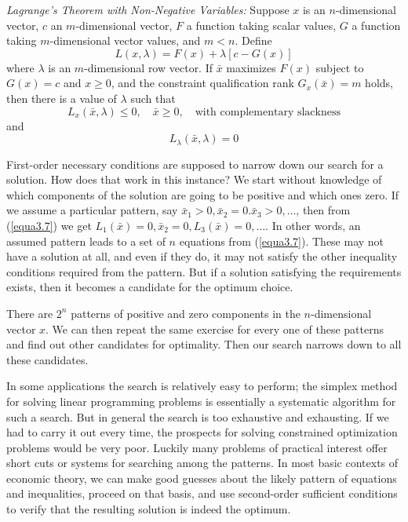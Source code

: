 \textit{Lagrange's Theorem with Non-Negative Variables:} Suppose $x$ is an $n$-dimensional vector, $c$ an $m$-dimensional vector, $F$ a function taking scalar values, $G$ a function taking $m$-dimensional vector values, and $m<n$. Define
\begin{equation*} \tag{3.4}
L(x, \lambda) = F(x) + \lambda[c-G(x)]
\end{equation*}
where $\lambda$ is an $m$-dimensional row vector. If $\bar{x}$ maximizes $F(x)$ subject to $G(x)=c$ and $x \geq 0$, and the constraint qualification rank $G_x(\bar{x}) = m $ holds, then there is a value of $\lambda$ such that
\begin{equation*} \tag{3.7}
L_x(\bar{x}, \lambda) \leq 0, \quad \bar{x} \geq 0, \quad \mbox{with complementary slackness}
\end{equation*}
and
\begin{equation*} \tag{3.6}
L_\lambda(\bar{x}, \lambda) = 0
\end{equation*}

First-order necessary conditions are supposed to narrow down our search for a solution. How does that work in this instance? We start without knowledge of which components of the solution are going to be positive and which ones zero. If we assume a particular pattern, say $\bar{x}_1 >0 , \bar{x}_2 =0. \bar{x}_3>0, \dots $, then from (\ref{equa3.7}) we get $L_1(\bar{x})=0, \bar{x}_2=0, L_3(\bar{x})=0, \dots$. In other words, an assumed pattern leads to a set of $n$ equations from (\ref{equa3.7}). These may not have a solution at all, and even if they do, it may not satisfy the other inequality conditions required from the pattern. But if a solution satisfying the requirements exists, then it becomes a candidate for the optimum choice.

There are $2^n$ patterns of positive and zero components in the $n$-dimensional vector $x$. We can then repeat the same exercise for every one of these patterns and find out other candidates for optimality. Then our search narrows down to all these candidates.

In some applications the search is relatively easy to perform; the simplex method for solving linear programming problems is essentially a systematic algorithm for such a search. But in general the search is too exhaustive and exhausting. If we had to carry it out every time, the prospects for solving constrained optimization problems would be very poor. Luckily many problems of practical interest offer short cuts or systems for searching among the patterns. In most basic contexts of economic theory, we can make good guesses about the likely pattern of equations and inequalities, proceed on that basis, and use second-order sufficient conditions to verify that the resulting solution is indeed the optimum.

